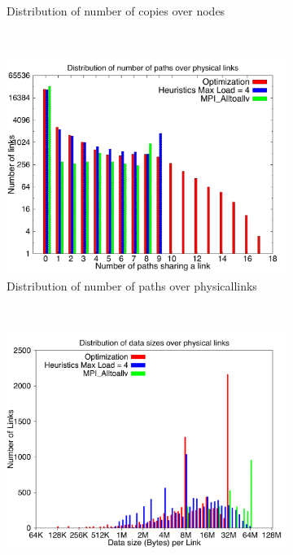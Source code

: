 \begin{figure}[!htbp]
\begin{subfigure}[b]{0.49\textwidth}
                \caption{Distribution of number of copies over nodes}
                \label{fig:87_4096_copy}
        \end{subfigure}
        ~ %
        \begin{subfigure}[b]{0.49\textwidth}
                \includegraphics[width=\textwidth]{report_figures/constantr/87_4096/loadpath_histo.pdf}
                \caption{Distribution of number of paths over physicallinks}
                \label{fig:87_4096_loadpath}
        \end{subfigure}
        ~ %
        \begin{subfigure}[b]{0.49\textwidth}
                \includegraphics[width=\textwidth]{report_figures/constantr/87_4096/loaddata_histo.pdf}

\end{subfigure}
\end{figure}
